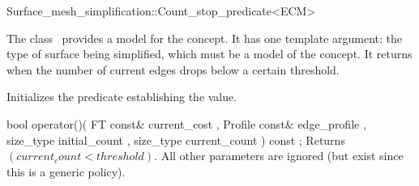 

\begin{ccRefFunctionObjectClass}{Surface_mesh_simplification::Count_stop_predicate<ECM>}


\ccDefinition

The class \ccRefName\ provides a model for the  concept.
It has one template argument: the type of surface being simplified,
which must be a model of the  concept.
It returns  when the number of current edges drops below a certain threshold.


\ccIsModel
{}

\ccCreation
{}  

{Initializes the predicate establishing the  value.} 

\ccTagFullDeclarations
\ccOperations
{}

  \ccMemberFunction
    {bool operator()( FT const&      current_cost
                    , Profile const& edge_profile
                    , size_type      initial_count
                    , size_type      current_count
                    ) const ;
           }
  {Returns $(current_count < threshold)$. All other parameters are ignored (but exist since this is a generic policy).}

\ccSeeAlso
{}

\end{ccRefFunctionObjectClass}



